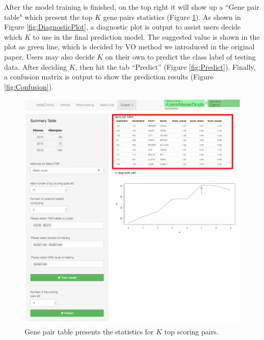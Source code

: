 \documentclass{article}
\begin{document}
After the model training is finished, on the top right it will show up a ``Gene pair table" which present the top $K$ gene pairs statistics (Figure \ref{fig:PairTable}). As shown in Figure \ref{fig:DiagnosticPlot}, a diagnostic plot is output to assist users decide which $K$ to use in the final prediction model. The suggested value is shown in the plot as green line, which is decided by VO method we introduced in the original paper. Users may also decide $K$ on their own to predict the class label of testing data. After deciding $K$, then hit the tab ``Predict'' (Figure \ref{fig:Predict}). Finally, a confusion matrix is output to show the prediction results (Figure \ref{fig:Confusion}).

\begin{figure}[H]
\begin{center}
\includegraphics[scale=0.7]{./figure/MetaKTSP/Figure9.pdf}
\caption{Gene pair table presents the statistics for $K$ top scoring pairs.}
\label{fig:PairTable}
\end{center}
\end{figure}
\end{document}
